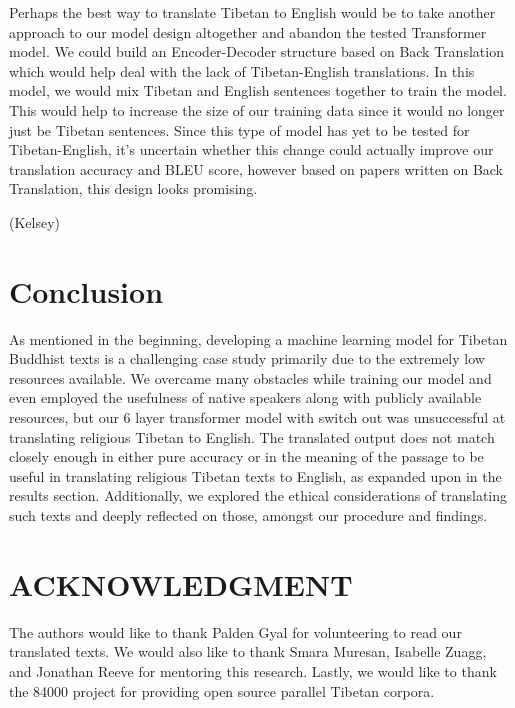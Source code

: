 \documentclass[letterpaper, 12 pt, conference]{ieeeconf}  %
\begin{document}
Perhaps the best way to translate Tibetan to English would be to take another approach to our model design altogether and abandon the tested Transformer model. We could build an Encoder-Decoder structure based on Back Translation which would help deal with the lack of Tibetan-English translations. In this model, we would mix Tibetan and English sentences together to train the model. This would help to increase the size of our training data since it would no longer just be Tibetan sentences. Since this type of model has yet to be tested for Tibetan-English, it's uncertain whether this change could actually improve our translation accuracy and BLEU score, however based on papers written on Back Translation, this design looks promising.


(Kelsey)



\section{Conclusion}


As mentioned in the beginning, developing a machine learning model for Tibetan Buddhist texts is a challenging case study primarily due to the extremely low resources available. We overcame many obstacles while training our model and even employed the usefulness of native speakers along with publicly available resources, but our 6 layer transformer model with switch out was unsuccessful at translating religious Tibetan to English. The translated output does not match closely enough in either pure accuracy or in the meaning of the passage to be useful in translating religious Tibetan texts to English, as expanded upon in the results section. Additionally, we explored the ethical considerations of translating such texts and deeply reflected on those, amongst our procedure and findings.




\section*{ACKNOWLEDGMENT}

The authors would like to thank Palden Gyal for volunteering to read our translated texts. We would also like to thank Smara Muresan, Isabelle Zuagg, and Jonathan Reeve for mentoring this research. Lastly, we would like to thank the 84000 project for providing open source parallel Tibetan corpora. 
\end{document}
